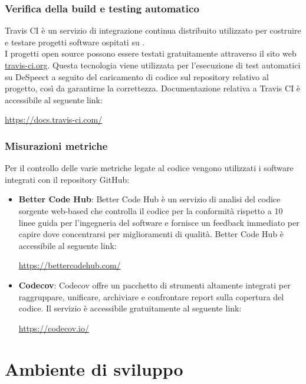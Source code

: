 \documentclass[openany,12pt,a4paper]{report}
\begin{document}
	\subsection{Verifica della build e testing automatico}
	Travis CI è un servizio di integrazione continua distribuito utilizzato per costruire e testare progetti software ospitati su . \\ I progetti open source possono essere testati gratuitamente attraverso il sito web  \url{travis-ci.org}. Questa tecnologia viene utilizzata per l'esecuzione di test automatici su DeSpeect a seguito del caricamento di codice sul repository relativo al progetto, così da garantirne la correttezza. Documentazione relativa a Travis CI è accessibile al seguente link:
	\begin{center}
		\url{https://docs.travis-ci.com/}
	\end{center}
	
	\subsection{Misurazioni metriche}
	Per il controllo delle varie metriche legate al codice vengono utilizzati i software integrati con il repository GitHub:
	\begin{itemize}
		\item \textbf{Better Code Hub}: Better Code Hub è un servizio di analisi del codice sorgente web-based che controlla il codice per la conformità rispetto a 10 linee guida per l'ingegneria del software e fornisce un feedback immediato per capire dove concentrarsi per miglioramenti di qualità. Better Code Hub è accessibile al seguente link:
		\begin{center}
			\url{https://bettercodehub.com/}
		\end{center}
		
		\item \textbf{Codecov}: Codecov offre un pacchetto di strumenti altamente integrati per raggruppare, unificare, archiviare e confrontare report sulla copertura del codice. Il servizio è accessibile gratuitamente al seguente link: 
		\begin{center}
			\url{https://codecov.io/}
		\end{center}
	\end{itemize} 
	
	\chapter{Ambiente di sviluppo}
	
\end{document}
